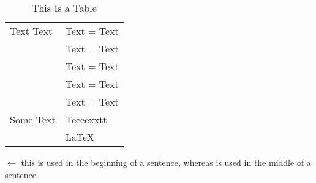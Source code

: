 \begin{table}[H]
\begin{tabular}{|l|p{5cm}|l|l|l|}
  \multicolumn{2}{|l|}{Text Text}    & \multicolumn{3}{l|}{Text = Text}                    \\
  \multicolumn{2}{|l|}{}             & \multicolumn{3}{l|}{Text = Text}                    \\
  \multicolumn{2}{|l|}{}             & \multicolumn{3}{l|}{Text = Text}                    \\
  \multicolumn{2}{|l|}{}             & \multicolumn{3}{l|}{Text = Text}                    \\
  \multicolumn{2}{|l|}{}             & \multicolumn{3}{l|}{Text = Text}                    \\
  \hline %
  \multicolumn{2}{|l|}{Some Text}    & \multicolumn{3}{l|}{Teeeexxtt}                      \\
  \multicolumn{2}{|l|}{}             & \multicolumn{3}{l|}{\LaTeX}                         \\
  \hline %
\end{tabular}
\caption{This Is a Table\label{TableLABEL}}
\end{table}

 $\leftarrow$ this is used in the beginning of a sentence, whereas  is used in the middle of a sentence.

\pagebreak